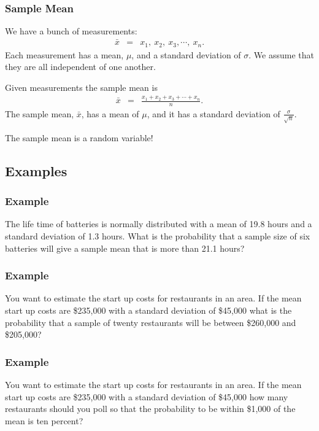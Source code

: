 \begin{frame}
  \frametitle{Sample Mean}

  We have a bunch of measurements:
  \begin{eqnarray*}
    \bar{x} & = & x_1,~x_2,~x_3,\cdots,~x_n.
  \end{eqnarray*}
  Each measurement has a mean, $\mu$, and a standard deviation of
  $\sigma$. We assume that they are all independent of one another.
  
    \begin{definition}
      Given measurements the sample mean is 
      \begin{eqnarray*}
        \bar{x} & = & \frac{x_1+x_2+x_3+\cdots+x_n}{n}.
      \end{eqnarray*}
      The sample mean, $\bar{x}$,  has a mean of $\mu$, and it has a
      standard deviation of $\frac{\sigma}{\sqrt{n}}$.
    \end{definition}

    The sample mean is a random variable!

\end{frame}


\subsection{Examples}

\begin{frame}
  \frametitle{Example}

  The life time of batteries is normally distributed with a mean of
  19.8 hours and a standard deviation of 1.3 hours. What is the
  probability that a sample size of six batteries will give a sample
  mean that is more than 21.1 hours?

\end{frame}


\begin{frame}
  \frametitle{Example}

  You want to estimate the start up costs for restaurants in an
  area. If the mean start up costs are \$235,000 with a standard
  deviation of \$45,000 what is the probability that a sample of
  twenty restaurants will be between \$260,000 and \$205,000?

\end{frame}


\begin{frame}
  \frametitle{Example}

  You want to estimate the start up costs for restaurants in an
  area. If the mean start up costs are \$235,000 with a standard
  deviation of \$45,000 how many restaurants should you poll so that
  the probability to be within \$1,000 of the mean is ten percent?

\end{frame}


